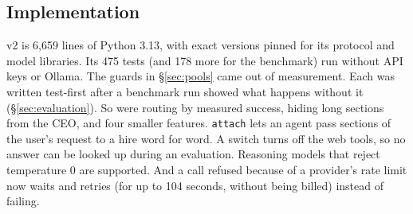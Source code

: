 \subsection{Implementation}
\sys{} v2 is 6,659 lines of Python 3.13, with exact versions pinned for its protocol and model libraries. Its 475
tests (and 178 more for the benchmark) run without API keys or Ollama. The guards in \S\ref{sec:pools} came out of measurement. Each was written
test-first after a benchmark run showed what happens without it (\S\ref{sec:evaluation}). So were routing by measured
success, hiding long sections from the CEO, and four smaller features. \texttt{attach} lets an agent pass sections of
the user's request to a hire word for word. A switch turns off the web tools, so no answer can be looked up during an
evaluation. Reasoning models that reject temperature 0 are supported. And a call refused because of a provider's rate
limit now waits and retries (for up to 104 seconds, without being billed) instead of failing.
